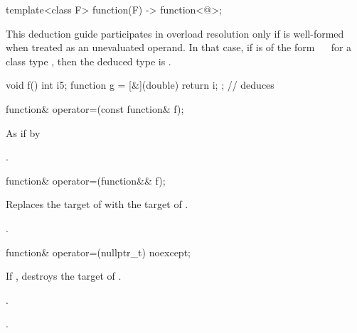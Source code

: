 \begin{itemdecl}
template<class F> function(F) -> function<@\seebelow@>;
\end{itemdecl}

\begin{itemdescr}
\pnum
\remarks This deduction guide participates in overload resolution only if
 is well-formed when treated as an unevaluated operand.
In that case, if  is of the form
~\cv{}~
for a class type , then the deduced type is .

\pnum
\begin{example}
\begin{codeblock}
void f() {
  int i{5};
  function g = [&](double) { return i; }; // deduces 
}
\end{codeblock}
\end{example}
\end{itemdescr}

%
\begin{itemdecl}
function& operator=(const function& f);
\end{itemdecl}

\begin{itemdescr}
\pnum
\effects As if by 

\pnum
\returns {}.
\end{itemdescr}

%
\begin{itemdecl}
function& operator=(function&& f);
\end{itemdecl}

\begin{itemdescr}
\pnum
\effects Replaces the target of 
with the target of .

\pnum
\returns {}.
\end{itemdescr}

%
\begin{itemdecl}
function& operator=(nullptr_t) noexcept;
\end{itemdecl}

\begin{itemdescr}
\pnum\effects If , destroys the target of .

\pnum\postconditions {}.

\pnum\returns {}.
\end{itemdescr}

